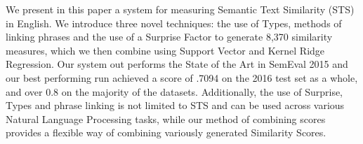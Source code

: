 We present in this paper a system for measuring Semantic Text Similarity (STS) in English. We introduce three novel techniques: the use of Types, methods of linking phrases and the use of a Surprise Factor to generate 8,370 similarity measures, which we then combine using Support Vector and Kernel Ridge Regression. Our system out performs the State of the Art in SemEval 2015 and our best performing run achieved a score of .7094 on the 2016 test set as a whole, and over 0.8 on the majority of the datasets. Additionally, the use of Surprise, Types and phrase linking is not limited to STS and can be used across various Natural Language Processing tasks, while our method of combining scores provides a flexible way of combining variously generated Similarity Scores.
